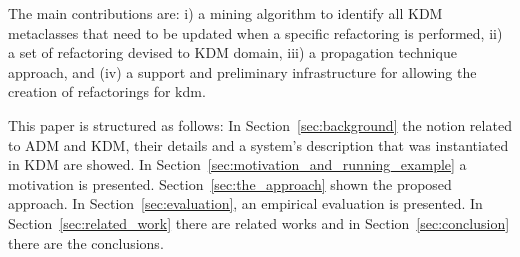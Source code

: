 The main contributions are: i) a mining algorithm to identify all KDM metaclasses that need to be updated when a specific refactoring is performed, ii) a set of refactoring devised to KDM domain, iii) a propagation technique approach, and (iv) a support and preliminary infrastructure for allowing the creation of refactorings for kdm.

This paper is structured as follows: In Section~\ref{sec:background} the notion related to ADM and KDM, their details and a system's description that was instantiated in KDM are showed.
%
%
In Section~\ref{sec:motivation_and_running_example} a motivation is presented. Section~\ref{sec:the_approach} shown the proposed approach. In Section~\ref{sec:evaluation}, an empirical evaluation is presented. In Section~\ref{sec:related_work} there are related works and in Section~\ref{sec:conclusion} there are the conclusions.

